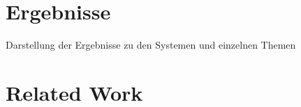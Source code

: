 \documentclass[a4paper,12pt,headsepline]{report}
\begin{document}
\chapter{Ergebnisse}
Darstellung der Ergebnisse zu den Systemen und einzelnen Themen

\chapter{Related Work}
\nocite{Robinson2015}
\nocite{Angles2012}



\nocite{Robinson2015}


	

	
\end{document}
